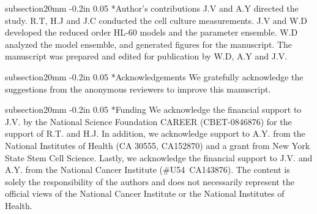 \documentclass[12pt]{article}
\makeatletter
\renewcommand\section{\@startsection
	{subsection}{2}{0mm}
	{-0.2in}
	{0.05\baselineskip}
	{\normalfont\large\bfseries}}
\makeatother
\begin{document}
\section*{Author's contributions}
J.V and A.Y directed the study. R.T, H.J and J.C conducted the cell culture measurements.
J.V and W.D developed the reduced order HL-60 models and the parameter ensemble.
W.D analyzed the model ensemble, and generated figures for the manuscript.
The manuscript was prepared and edited for publication by W.D, A.Y and J.V.

\section*{Acknowledgements}
We gratefully acknowledge the suggestions from the anonymous reviewers to improve this manuscript.

\section*{Funding}
We acknowledge the financial support to J.V. by the National Science Foundation CAREER (CBET-0846876) for the support of R.T. and H.J.
In addition, we acknowledge support to A.Y. from the National Institutes of Health (CA 30555, CA152870)
and a grant from New York State Stem Cell Science.
Lastly, we acknowledge the financial support to J.V. and A.Y. from the National Cancer Institute (\#U54~CA143876).
The content is solely the responsibility of the authors and does not necessarily
represent the official views of the National Cancer Institute or the National Institutes of Health.

\clearpage



\clearpage
\end{document}
